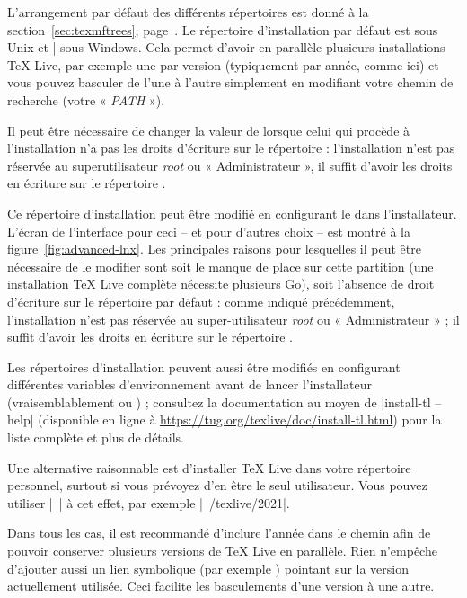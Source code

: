 \documentclass[german, english, french]{article}
\renewcommand{\TL}{\TeX{} Live\xspace}%
\newcommand\eng[1]{\foreignlanguage{english}{\emph{#1}}}
\begin{document}
L'arrangement par défaut des différents répertoires est donné à la
section~\ref{sec:texmftrees}, page~\pageref{sec:texmftrees}.  Le répertoire
d'installation par défaut est  sous Unix et
|%
sous Windows. Cela permet d'avoir en parallèle plusieurs installations \TL{},
par exemple une par version (typiquement par année, comme ici) et vous pouvez
basculer de l'une à l'autre simplement en modifiant votre chemin de recherche
(votre « \emph{PATH} »).

Il peut être nécessaire de changer la valeur de  lorsque celui
qui procède à l'installation n'a pas les droits d'écriture sur le répertoire
 : l'installation n'est pas réservée au superutilisateur
\eng{root} ou « Administrateur », il suffit d'avoir les droits en écriture sur
le répertoire .

Ce répertoire d'installation peut être modifié en configurant le
 dans l'installateur. L'écran de l'interface pour ceci -- et
pour d'autres choix -- est montré à la figure~\ref{fig:advanced-lnx}.  Les
principales raisons pour lesquelles il peut être nécessaire de le modifier sont
soit le manque de place sur cette partition (une installation \TL{} complète
nécessite plusieurs Go), soit l'absence de droit d'écriture sur le répertoire
par défaut : comme indiqué précédemment, l'installation n'est pas réservée au
super-utilisateur \eng{root} ou « Administrateur » ; il suffit d'avoir les
droits en écriture sur le répertoire .

Les répertoires d'installation peuvent aussi être modifiés en configurant
différentes variables d'environnement avant de lancer l'installateur
(vraisemblablement  ou
) ; consultez la documentation au moyen de
|install-tl --help| (disponible en ligne
à \url{https://tug.org/texlive/doc/install-tl.html}) pour la liste complète et
plus de détails.

Une alternative raisonnable est d'installer \TL{} dans votre répertoire
personnel, surtout si vous prévoyez d'en être le seul utilisateur. Vous pouvez
utiliser |~| à cet effet, par exemple |~/texlive/2021|.

Dans tous les cas, il est recommandé d'inclure l'année dans le chemin afin de
pouvoir conserver plusieurs versions de \TL{} en parallèle.  Rien n'empêche
d'ajouter aussi un lien symbolique (par exemple
) pointant sur la version actuellement
utilisée. Ceci facilite les basculements d'une version à une autre.
\end{document}

